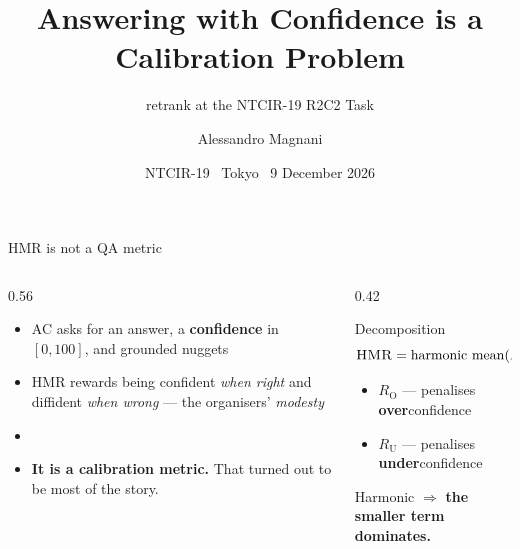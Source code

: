 \documentclass[aspectratio=169,11pt]{beamer}
\title{Answering with Confidence is a Calibration Problem}
\subtitle{retrank at the NTCIR-19 R2C2 Task}
\author{Alessandro Magnani}
\institute{Independent Researcher}
\date{NTCIR-19 \textbar\ Tokyo \textbar\ 9 December 2026}
\newcommand{\HMR}{\textsc{HMR}}
\newcommand{\RO}{R_{\mathrm{O}}}
\newcommand{\RU}{R_{\mathrm{U}}}
\newcommand{\hl}[1]{{\color{accent}\textbf{#1}}}
\begin{document}
\begin{frame}[plain]
  \titlepage
\end{frame}

\begin{frame}{\HMR{} is not a QA metric}
\begin{columns}[T]
\begin{column}{0.56\textwidth}
\begin{itemize}\setlength\itemsep{0.5em}
  \item AC asks for an answer, a \textbf{confidence} in $[0,100]$, and grounded nuggets
  \item \HMR{} rewards being confident \emph{when right} and diffident \emph{when wrong}
        --- the organisers' \emph{modesty}
  \item[] 
  \item \hl{It is a calibration metric.}
        That turned out to be most of the story.
\end{itemize}
\end{column}
\begin{column}{0.42\textwidth}
\begin{block}{Decomposition}
\[ \HMR = \mathrm{harmonic\ mean}(\RO,\RU) \]
\begin{itemize}
  \item $\RO$ --- penalises \textbf{over}confidence
  \item $\RU$ --- penalises \textbf{under}confidence
\end{itemize}
\vspace{0.3em}
Harmonic $\Rightarrow$ \hl{the smaller term dominates.}
\end{block}
\end{column}
\end{columns}
\end{frame}
\end{document}
